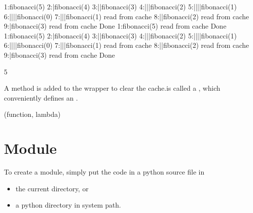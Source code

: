 \documentclass[letterpaper,10pt,english]{sphinxmanual}
\begin{document}
\begin{sphinxVerbatim}[commandchars=\\\{\}]
  1:fibonacci(5)
  2:|fibonacci(4)
  3:||fibonacci(3)
  4:|||fibonacci(2)
  5:||||fibonacci(1)
  6:||||fibonacci(0)
  7:|||fibonacci(1)
read from cache
  8:||fibonacci(2)
read from cache
  9:|fibonacci(3)
read from cache
Done
  1:fibonacci(5)
read from cache
Done
  1:fibonacci(5)
  2:|fibonacci(4)
  3:||fibonacci(3)
  4:|||fibonacci(2)
  5:||||fibonacci(1)
  6:||||fibonacci(0)
  7:|||fibonacci(1)
read from cache
  8:||fibonacci(2)
read from cache
  9:|fibonacci(3)
read from cache
Done
\end{sphinxVerbatim}

\begin{sphinxVerbatim}[commandchars=\\\{\}]
5
\end{sphinxVerbatim}

A method  is added to the wrapper to clear the cache.is called a , which conveniently defines an .

\begin{sphinxVerbatim}[commandchars=\\\{\}]
 
\end{sphinxVerbatim}

\begin{sphinxVerbatim}[commandchars=\\\{\}]
(function, \PYGZsq{}\PYGZlt{}lambda\PYGZgt{}\PYGZsq{})
\end{sphinxVerbatim}


\section{Module}
\label{\detokenize{Lecture6/More on Functions:module}}

To create a module, simply put the code in a python source file  in
\begin{itemize}
\item {} 
the current directory, or

\item {} 
a python  directory in system path.

\end{itemize}
\end{document}

